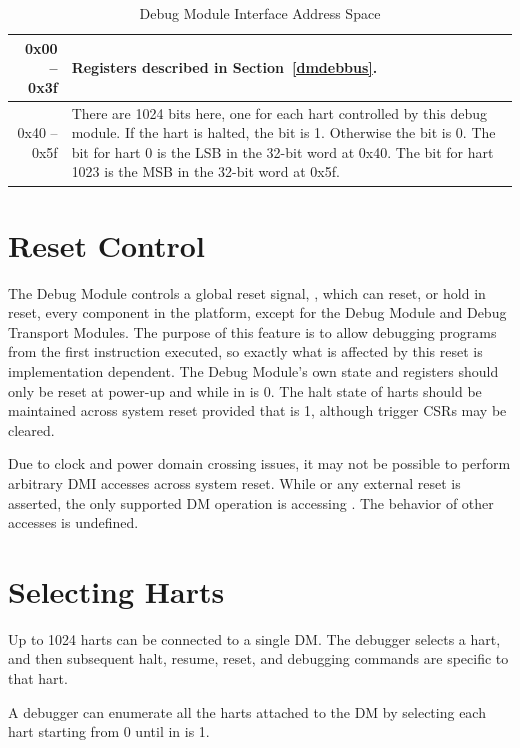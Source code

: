 \begin{table}[htp]
    \centering
    \caption{Debug Module Interface Address Space}
    \label{tab:header}
    \begin{tabulary}{\textwidth}{|r|L|}
        \hline
        0x00 -- 0x3f & Registers described in Section~\ref{dmdebbus}. \\
        \hline
        0x40 -- 0x5f & There are 1024 bits here, one for each hart controlled
        by this debug module. If the hart is halted, the bit is 1.  Otherwise
        the bit is 0. The bit for hart 0 is the LSB in the 32-bit word at 0x40.
        The bit for hart 1023 is the MSB in the 32-bit word at 0x5f. \\
        \hline
    \end{tabulary}
\end{table}

\section{Reset Control} \label{reset}

The Debug Module controls a global reset signal, \Fndmreset,
which can reset, or hold in reset, every component in the platform,
except for the Debug Module and Debug
Transport Modules. The purpose of this feature is to allow debugging
programs from the first instruction executed, so exactly what is affected
by this reset is implementation dependent.
The Debug Module's own state and registers should only be
reset at power-up and while
\Fdmactive in \Rdmcontrol is 0.
The halt state of harts should be
maintained across system reset provided that \Fdmactive is 1,
although trigger CSRs may be cleared.

Due to clock and power domain crossing issues,
it may not be possible to perform arbitrary DMI accesses across
system reset.
While \Fndmreset or any external reset is asserted, the only supported DM
operation is accessing \Rdmcontrol. The behavior of other accesses is
undefined.

\section{Selecting Harts} \label{selectingharts}

Up to 1024 harts can be connected to a single DM. The debugger
selects a hart, and then subsequent halt, resume, reset, and debugging
commands are specific to that hart.

A debugger can enumerate all the harts
attached to the DM by selecting each hart starting from 0
until \Fanynonexistent in \Rdmstatus is 1.

